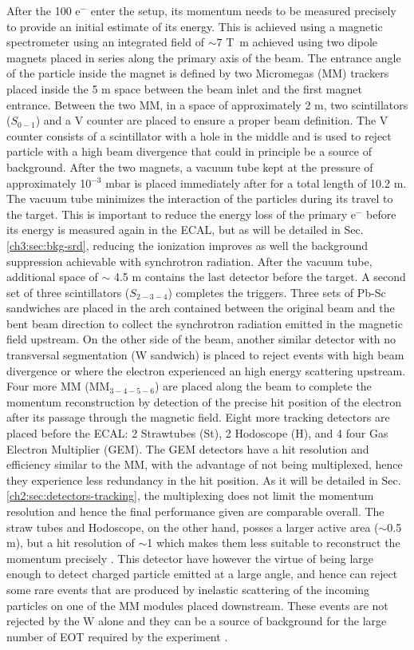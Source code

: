 After the 100 \gev e$^-$ enter the setup, its momentum needs to be measured precisely to provide an initial estimate of its energy. This is achieved using a magnetic spectrometer using an integrated field of $\sim 7$ \si{\tesla\meter} achieved using two dipole magnets \cite{mbpl} placed in series along the primary axis of the beam. The entrance angle of the particle inside the magnet is defined by two Micromegas (MM) trackers placed inside the 5 m space between the beam inlet and the first magnet entrance. Between the two MM, in a space of approximately 2 m, two scintillators ($S_{0-1}$) and a V counter are placed to ensure a proper beam definition. The V counter consists of a scintillator with a hole in the middle and is used to reject particle with a high beam divergence that could in principle be a source of background. After the two magnets, a vacuum tube kept at the pressure of approximately 10$^{-3}$ \si{mbar} is placed immediately after for a total length of 10.2 \si{m}. The vacuum tube minimizes the interaction of the particles during its travel to the target. This is important to reduce the energy loss of the primary e$^-$ before its energy is measured again in the ECAL, but as will be detailed in Sec.\ref{ch3:sec:bkg-srd}, reducing the ionization improves as well the background suppression achievable with synchrotron radiation. After the vacuum tube, additional space of $\sim$ 4.5 \si{m} contains the last detector before the target. A second set of three scintillators ($S_{2-3-4}$) completes the triggers. Three sets of Pb-Sc sandwiches are placed in the arch contained between the original beam and the bent beam direction to collect the synchrotron radiation emitted in the magnetic field upstream. On the other side of the beam, another similar detector with no transversal segmentation (W sandwich) is placed to reject events with high beam divergence or where the electron experienced an high energy scattering upstream. Four more MM (MM$_{3-4-5-6}$) are placed along the beam to complete the momentum reconstruction by detection of the precise hit position of the electron after its passage through the magnetic field. Eight more tracking detectors are placed before the ECAL: 2 Strawtubes (St), 2 Hodoscope (H), and 4 four Gas Electron Multiplier (GEM). The GEM detectors have a hit resolution and efficiency similar to the MM, with the advantage of not being multiplexed, hence they experience less redundancy in the hit position. As it will be detailed in Sec.\ref{ch2:sec:detectors-tracking}, the multiplexing does not limit the momentum resolution and hence the final performance given are comparable overall. The straw tubes and Hodoscope, on the other hand, posses a larger active area ($\sim$0.5 m), but a hit resolution of $\sim$1 \mmi which makes them less suitable to reconstruct the momentum precisely \cite{Volkov:2019qhb}. This detector have however the virtue of being large enough to detect charged particle emitted at a large angle, and hence can reject some rare events that are produced by inelastic scattering of the incoming particles on one of the MM modules placed downstream. These events are not rejected by the W alone and they can be a source of background for the large number of EOT required by the experiment \cite{na64-prd}. 

